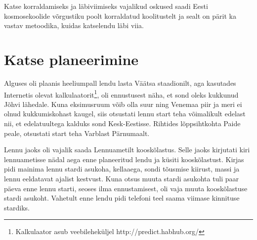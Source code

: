 \documentclass{trkut}%
\begin{document}
Katse korraldamiseks ja läbiviimiseks vajalikud oskused saadi Eesti kosmosekoolide võrgustiku poolt korraldatud koolitustelt ja sealt on pärit ka vastav metoodika, kuidas katselendu läbi viia.

\section{Katse planeerimine}
Alguses oli plaanis heeliumpall lendu lasta Väätsa staadionilt, aga kasutades Internetis olevat kalkulaatorit\footnote{Kalkulaator asub veebileheküljel http://predict.habhub.org/}, oli ennustusest näha, et sond oleks kukkunud Jõhvi lähedale. Kuna eksimusruum võib olla suur ning Venemaa piir ja meri ei olnud kukkumiskohast kaugel, siis otsustati lennu start teha võimalikult edelast nii, et edelatuultega kalduks sond Kesk-Eestisse. Rihtides lõppsihtkohta Paide peale, otsustati start teha Varblast Pärnumaalt.

Lennu jaoks oli vajalik saada Lennuametilt kooskõlastus. Selle jaoks kirjutati kiri lennuametisse nädal aega enne planeeritud lendu ja küsiti kooskõlastust. Kirjas pidi mainima lennu stardi asukoha, kellaaega, sondi tõusmise kiirust, massi ja lennu eeldatavat ajalist kestvust. Kuna otsus muuta stardi asukohta tuli paar päeva enne lennu starti, seoses ilma ennustamisest, oli vaja muuta kooskõlastuse stardi asukoht. Vahetult enne lendu pidi telefoni teel saama viimase kinnituse stardiks.
\end{document}
